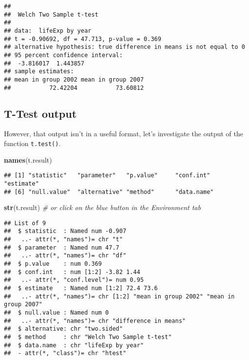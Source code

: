 \documentclass[]{book}
\makeatletter
\newenvironment{Shaded}{\begin{snugshade}}{\end{snugshade}}
\newcommand{\KeywordTok}[1]{\textcolor[rgb]{0.13,0.29,0.53}{\textbf{#1}}}
\newcommand{\CommentTok}[1]{\textcolor[rgb]{0.56,0.35,0.01}{\textit{#1}}}
\newcommand{\NormalTok}[1]{#1}
\newenvironment{kframe}{%
\medskip{}
\setlength{\fboxsep}{.8em}
 \def\at@end@of@kframe{}%
 \ifinner\ifhmode%
  \def\at@end@of@kframe{\end{minipage}}%
  \begin{minipage}{\columnwidth}%
 \fi\fi%
 \def\FrameCommand##1{\hskip\@totalleftmargin \hskip-\fboxsep
 \colorbox{shadecolor}{##1}\hskip-\fboxsep
     \hskip-\linewidth \hskip-\@totalleftmargin \hskip\columnwidth}%
 \MakeFramed {\advance\hsize-\width
   \@totalleftmargin\z@ \linewidth\hsize
   \@setminipage}}%
 {\par\unskip\endMakeFramed%
 \at@end@of@kframe}
\renewenvironment{Shaded}{\begin{kframe}}{\end{kframe}}
\theoremstyle{definition}
\theoremstyle{definition}
\theoremstyle{definition}
\theoremstyle{remark}
\makeatother
\begin{document}
\begin{verbatim}
## 
##  Welch Two Sample t-test
## 
## data:  lifeExp by year
## t = -0.90692, df = 47.713, p-value = 0.369
## alternative hypothesis: true difference in means is not equal to 0
## 95 percent confidence interval:
##  -3.816017  1.443857
## sample estimates:
## mean in group 2002 mean in group 2007 
##           72.42204           73.60812
\end{verbatim}

\subsection{T-Test output}\label{t-test-output}

However, that output isn't in a useful format, let's investigate the
output of the function \texttt{t.test()}.

\begin{Shaded}
\begin{Highlighting}[]
\KeywordTok{names}\NormalTok{(t.result)}
\end{Highlighting}
\end{Shaded}

\begin{verbatim}
## [1] "statistic"   "parameter"   "p.value"     "conf.int"    "estimate"   
## [6] "null.value"  "alternative" "method"      "data.name"
\end{verbatim}

\begin{Shaded}
\begin{Highlighting}[]
\KeywordTok{str}\NormalTok{(t.result) }\CommentTok{# or click on the blue button in the Environment tab}
\end{Highlighting}
\end{Shaded}

\begin{verbatim}
## List of 9
##  $ statistic  : Named num -0.907
##   ..- attr(*, "names")= chr "t"
##  $ parameter  : Named num 47.7
##   ..- attr(*, "names")= chr "df"
##  $ p.value    : num 0.369
##  $ conf.int   : num [1:2] -3.82 1.44
##   ..- attr(*, "conf.level")= num 0.95
##  $ estimate   : Named num [1:2] 72.4 73.6
##   ..- attr(*, "names")= chr [1:2] "mean in group 2002" "mean in group 2007"
##  $ null.value : Named num 0
##   ..- attr(*, "names")= chr "difference in means"
##  $ alternative: chr "two.sided"
##  $ method     : chr "Welch Two Sample t-test"
##  $ data.name  : chr "lifeExp by year"
##  - attr(*, "class")= chr "htest"
\end{verbatim}
\end{document}
